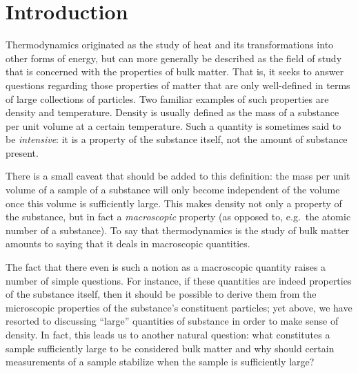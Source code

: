 
\chapter{Introduction}
\label{sec:intro}


Thermodynamics originated as the study of heat and its transformations into other
forms of energy, but can more generally be described as the field of study that
is concerned with the properties of bulk matter. That is, it seeks to
answer questions regarding those properties of matter that are only well-defined
in terms of large collections of particles. Two familiar examples of
such properties are density and temperature. Density is usually defined as the mass
of a substance per unit volume at a certain temperature. Such a quantity is
sometimes said to be \emph{intensive}: it is a property of the substance itself,
not the amount of substance present.

There is a small caveat that should be added to this definition: the mass per unit
volume of a sample of a substance will only become independent of the volume once
this volume is sufficiently large. This makes density not only a property of the
substance, but in fact a \emph{macroscopic} property (as opposed to, e.g.\ the
atomic number of a substance). To say that thermodynamics is the study of bulk
matter amounts to saying that it deals in macroscopic quantities.

The fact that there even is such a notion as a macroscopic quantity
raises a number of simple questions. For instance, if these quantities
are indeed properties of the substance itself, then it should be possible to 
derive them from the microscopic properties of the substance's constituent particles;
yet above, we have resorted to discussing ``large'' quantities of substance in order
to make sense of density. In fact, this leads us to another natural question: what
constitutes a sample sufficiently large to be considered bulk matter and why should
certain measurements of a sample stabilize when the sample is sufficiently large?

